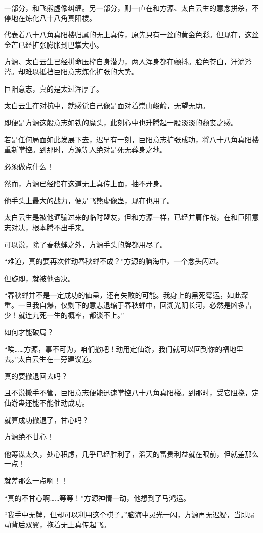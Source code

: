 \begin{this_body}
一部分，和飞熊虚像纠缠。另一部分，则一直在和方源、太白云生的意念拼杀，不停地在炼化八十八角真阳楼。

代表着八十八角真阳楼归属的无上真传，原先只有一丝的黄金色彩。但现在，这丝金芒已经扩张膨胀到巴掌大小。

方源、太白云生已经拼命压榨自身潜力，两人浑身都在颤抖。脸色苍白，汗滴涔涔。却难以抵挡巨阳意志炼化扩张的大势。

巨阳意志，真的是太过浑厚了。

太白云生在对抗中，就感觉自己像是面对着崇山峻岭，无望无助。

即便是方源这般意志如铁的魔头，此刻心中也升腾起一股淡淡的颓丧之感。

若是任何局面如此发展下去，迟早有一刻，巨阳意志扩张成功，将八十八角真阳楼重新掌控。到那时，方源等人绝对是死无葬身之地。

必须做点什么！

然而，方源已经陷在这道无上真传上面，抽不开身。

他手头上最大的战力，便是飞熊虚像蛊，现在也用了。

太白云生是被他诓骗过来的临时盟友，但和方源一样，已经并肩作战，在和巨阳意志对决，根本腾不出手来。

可以说，除了春秋蝉之外，方源手头的牌都用尽了。

“难道，真的要再次催动春秋蝉不成？”方源的脑海中，一个念头闪过。

但旋即，就被他否决。

“春秋蝉并不是一定成功的仙蛊，还有失败的可能。我身上的黑死霉运，如此深重。一旦我自爆，仅剩下的意志退缩于春秋蝉中，回溯光阴长河，必然是凶多吉少！就连九死一生的概率，都谈不上。”

如何才能破局？

“唉……方源，事不可为，咱们撤吧！动用定仙游，我们就可以回到你的福地里去。”太白云生在一旁建议道。

真的要撤退回去吗？

且不说撒手不管，巨阳意志便能迅速掌控八十八角真阳楼。到那时，受它阻挠，定仙游蛊还能不能催动成功。

就算成功撤退了，甘心吗？

方源绝不甘心！

他筹谋太久，处心积虑，几乎已经胜利了，滔天的富贵利益就在眼前，但就差那么一点！

就差那么一点啊！！

“真的不甘心啊……等等！”方源神情一动，他想到了马鸿运。

“我手中无牌，但却可以利用这个棋子。”脑海中灵光一闪，方源再无迟疑，当即扇动背后双翼，拖着无上真传起飞。


\end{this_body}
